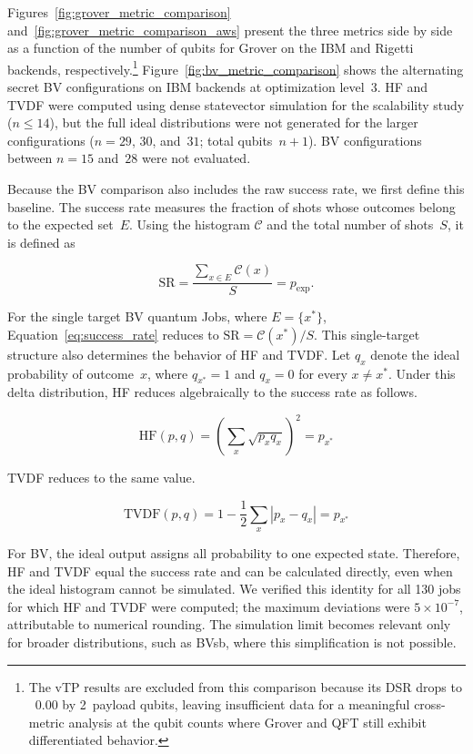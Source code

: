 \documentclass[10pt,conference]{IEEEtran}
\begin{document}
Figures~\ref{fig:grover_metric_comparison} and~\ref{fig:grover_metric_comparison_aws} present the three metrics side by side as a function of the number of qubits for Grover on the IBM and Rigetti backends, respectively.\footnote{The vTP results are excluded from this comparison because its DSR drops to ~$0.00$ by 2~payload qubits, leaving insufficient data for a meaningful cross-metric analysis at the qubit counts where Grover and QFT still exhibit differentiated behavior.} Figure~\ref{fig:bv_metric_comparison} shows the alternating secret BV configurations on IBM backends at optimization level~3. HF and TVDF were computed using dense statevector simulation for the scalability study ($n\leq 14$), but the full ideal distributions were not generated for the larger configurations ($n=29$, $30$, and~$31$; total qubits~$n{+}1$). BV configurations between $n=15$ and~$28$ were not evaluated.

Because the BV comparison also includes the raw success rate, we first define this baseline. The success rate measures the fraction of shots whose outcomes belong to the expected set~$E$. Using the histogram $\mathcal{C}$ and the total number of shots~$S$, it is defined as

\begin{equation}
\label{eq:success_rate}
\mathrm{SR}
=
\frac{\sum_{x\in E}\mathcal{C}(x)}{S}
=
p_{\mathrm{exp}}.
\end{equation}

For the single target BV quantum Jobs, where $E=\{x^\ast\}$, Equation~\eqref{eq:success_rate} reduces to $\mathrm{SR}=\mathcal{C}(x^\ast)/S$. This single-target structure also determines the behavior of HF and TVDF. Let $q_x$ denote the ideal probability of outcome~$x$, where $q_{x^\ast}=1$ and $q_x=0$ for every $x\neq x^\ast$. Under this delta distribution, HF reduces algebraically to the success rate as follows.

\begin{equation}
\label{eq:hf_bv}
\mathrm{HF}(p,q)
=
\left(\sum_x \sqrt{p_x q_x}\right)^2
=
p_{x^\ast}
\end{equation}

TVDF reduces to the same value.

\begin{equation}
\label{eq:tvdf_bv}
\mathrm{TVDF}(p,q)
=
1-\frac{1}{2}\sum_x |p_x-q_x|
=
p_{x^\ast}
\end{equation}

For BV, the ideal output assigns all probability to one expected state. Therefore, HF and TVDF equal the success rate and can be calculated directly, even when the ideal histogram cannot be simulated. We verified this identity for all 130 jobs for which HF and TVDF were computed; the maximum deviations were $5\times10^{-7}$, attributable to numerical rounding. The simulation limit becomes relevant only for broader distributions, such as BVsb, where this simplification is not possible.
\end{document}
